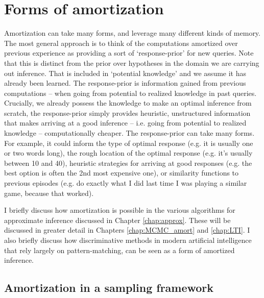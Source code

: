 
\section{Forms of amortization}

Amortization can take many forms, and leverage many different kinds of memory. The most general approach is to think of the computations amortized over previous experience as providing a sort of `response-prior' for new queries. Note that this is distinct from the prior over hypotheses in the domain we are carrying out inference. That is included in `potential knowledge' and we assume it has already been learned. The response-prior is information gained from previous computations -- when going from potential to realized knowledge in past queries. Crucially, we already possess the knowledge to make an optimal inference from scratch, the response-prior simply provides heuristic, unstructured information that makes arriving at a good inference -- i.e. going from potential to realized knowledge -- computationally cheaper. The response-prior can take many forms. For example, it could inform the type of optimal response (e.g. it is usually one or two words long), the rough location of the optimal response (e.g. it's usually between 10 and 40), heuristic strategies for arriving at good responses (e.g. the best option is often the 2nd most expensive one), or similarity functions to previous episodes (e.g. do exactly what I did last time I was playing a similar game, because that worked). 

I briefly discuss how amortization is possible in the various algorithms for approximate inference discussed in Chapter \ref{chap:approx}. These will be discussed in greater detail in Chapters \ref{chap:MCMC_amort} and \ref{chap:LTI}. I also briefly discuss how discriminative methods in modern artificial intelligence that rely largely on pattern-matching, can be seen as a form of amortized inference.

\subsection{Amortization in a sampling framework} 

